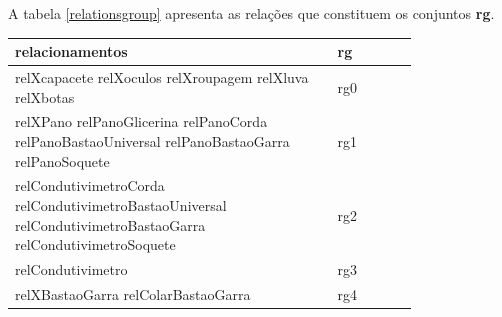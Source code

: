 \documentclass[12pt]{article}
\begin{document}
A tabela \ref{relationsgroup} apresenta as relações que constituem os conjuntos \textbf{rg}.

\begin{table}[H]
\centering
{}
\begin{tabular}{|p{0.8\linewidth}|l|}
\hline
\textbf{relacionamentos}                                                                                                                                                                                                                                                                                                                  & \textbf{rg} \\ \hline
relXcapacete relXoculos relXroupagem relXluva relXbotas                                                                                                                                                                                                                                                                                   & rg0         \\ \hline
relXPano relPanoGlicerina relPanoCorda relPanoBastaoUniversal relPanoBastaoGarra relPanoSoquete                                                                                                                                                                                                                                           & rg1         \\ \hline
relCondutivimetroCorda relCondutivimetroBastaoUniversal relCondutivimetroBastaoGarra relCondutivimetroSoquete                                                                                                                                                                                                                                & rg2         \\ \hline
relCondutivimetro                                                                                                                                                                                                                                                                                                                         & rg3         \\ \hline
relXBastaoGarra relColarBastaoGarra                                                                                                                                                                                                                                                                                                        & rg4         \\ \hline

\end{tabular}
\end{table}
\end{document}
